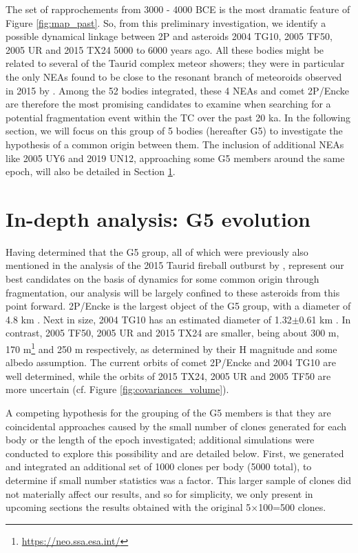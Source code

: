 \documentclass[letters,a4paper,fleqn,usenatbib]{mnras}
\begin{document}
The set of rapprochements from 3000 - 4000 BCE is the most dramatic feature of Figure \ref{fig:map_past}. So, from this preliminary investigation, we identify a possible dynamical linkage between 2P and asteroids 2004 TG10, 2005 TF50, 2005 UR and 2015 TX24 5000 to 6000 years ago. All these bodies might be related to several of the Taurid complex meteor showers; they were in particular the only NEAs found to be close to the resonant branch of meteoroids observed in 2015 by \cite{Spurny2017}. Among the 52 bodies integrated, these 4 NEAs and comet 2P/Encke are therefore the most promising candidates to examine when searching for a potential fragmentation event within the TC over the past 20 ka. In the following section, we will focus on this group of 5 bodies (hereafter G5) to investigate the hypothesis of a common origin between them. The inclusion of additional NEAs like 2005 UY6 and 2019 UN12, approaching some G5 members around the same epoch, will also be detailed in Section \ref{sec:G5}.

 \section{In-depth analysis: G5 evolution} \label{sec:G5}
 
 Having determined that the G5 group, all of which were previously also mentioned in the analysis of the 2015 Taurid fireball outburst by \cite{Spurny2017}, represent our best candidates on the basis of dynamics for some common origin through fragmentation, our analysis will be largely confined to these asteroids from this point forward. 2P/Encke is the largest object of the G5 group, with a diameter of 4.8 km \citep{Lamy2004}. Next in size, 2004 TG10 has an estimated diameter of 1.32$\pm$0.61 km \citep{Nugent2015}. In contrast, 2005 TF50, 2005 UR and 2015 TX24 are smaller, being about 300 m, 170 m\footnote{\url{https://neo.ssa.esa.int/}} and 250 m \citep{Masiero2017} respectively, as determined by their H magnitude and some albedo assumption. The current orbits of comet 2P/Encke and 2004 TG10 are well determined, while the orbits of 2015 TX24, 2005 UR and 2005 TF50 are more uncertain (cf. Figure \ref{fig:covariances_volume}).  
 
A competing hypothesis for the grouping of the G5 members is that they are coincidental approaches caused by the small number of clones generated for each body or the length of the epoch investigated; additional simulations were conducted to explore this possibility and are detailed below. First, we generated and integrated an additional set of 1000 clones per body (5000 total), to determine if small number statistics was a factor. This larger sample of clones did not materially affect our results, and so for simplicity, we only present in upcoming sections the results obtained with the original 5$\times$100=500 clones.
\end{document}
